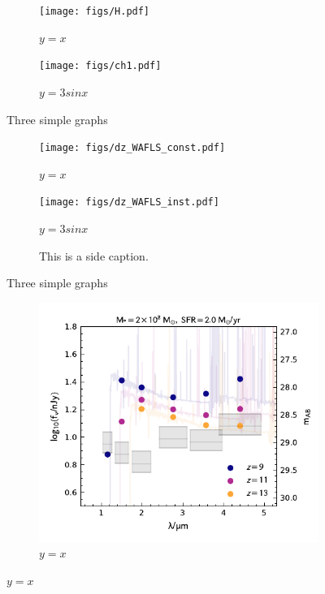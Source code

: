 \documentclass[12pt]{article}
\begin{document}
\begin{figure}
     \centering
     \begin{subfigure}[b]{0.4\textwidth}
         \centering
         \texttt{[image: figs/H.pdf]}
         \caption{$y=x$}
         \label{fig:y equals x}
     \end{subfigure}
     \hfill
     \begin{subfigure}[b]{0.4\textwidth}
         \centering
         \texttt{[image: figs/ch1.pdf]}
         \caption{$y=3sinx$}
         \label{fig:three sin x}
     \end{subfigure}
        \caption{Three simple graphs}
        \label{fig:three graphs}
\end{figure}


\begin{figure}
     \centering
     \begin{subfigure}[b]{0.3\textwidth}
         \centering
         \texttt{[image: figs/dz\_WAFLS\_const.pdf]}
         \caption{$y=x$}
         \label{fig:y equals x}
     \end{subfigure}
     \hfill
     \begin{subfigure}[b]{0.3\textwidth}
         \centering
         \texttt{[image: figs/dz\_WAFLS\_inst.pdf]}
         \caption{$y=3sinx$}
         \label{fig:three sin x}
     \end{subfigure}
     \begin{subfigure}[b]{0.3\textwidth}
         \caption{This is a side caption.}
     \end{subfigure}
        \caption{Three simple graphs}
        \label{fig:three graphs}
\end{figure}


\begin{figure}
     \centering
     \begin{subfigure}[b]{0.7\textwidth}
         \centering
         \includegraphics[width=\textwidth]{figs/SED.pdf}
         \caption{$y=x$}
         \label{fig:y equals x}
     \end{subfigure}
\end{figure}
\end{document}
